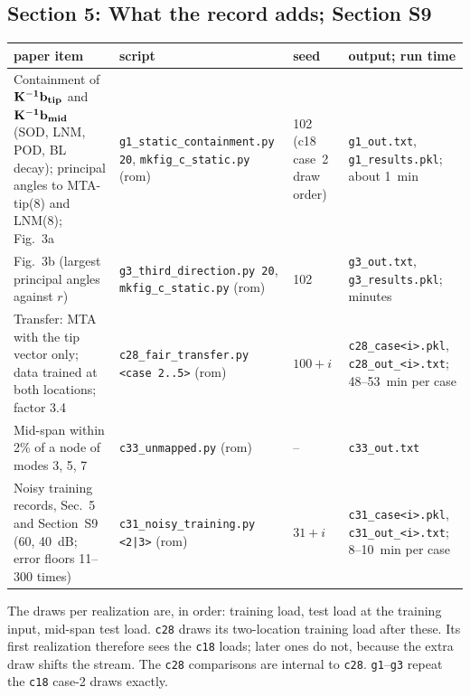 \documentclass[10pt]{article}
\newcommand{\f}[1]{\texttt{#1}}
\begin{document}
\subsection*{Section 5: What the record adds; Section S9}
\begin{longtable}{L{0.31\textwidth}L{0.25\textwidth}L{0.08\textwidth}L{0.25\textwidth}}
\toprule
paper item & script & seed & output; run time\\ \midrule
Containment of $\bf K^{-1}b_{tip}$ and $\bf K^{-1}b_{mid}$ (SOD, LNM, POD, BL decay); principal angles to MTA-tip(8) and LNM(8); Fig.~3a & \f{g1\_\allowbreak{}static\_\allowbreak{}containment.py 20}, \f{mkfig\_\allowbreak{}c\_\allowbreak{}static.py} (rom) & 102 (c18 case~2 draw order) & \f{g1\_\allowbreak{}out.txt}, \f{g1\_\allowbreak{}results.pkl}; about 1~min\\
Fig.~3b (largest principal angles against $r$) & \f{g3\_\allowbreak{}third\_\allowbreak{}direction.py 20}, \f{mkfig\_\allowbreak{}c\_\allowbreak{}static.py} (rom) & 102 & \f{g3\_\allowbreak{}out.txt}, \f{g3\_\allowbreak{}results.pkl}; minutes\\
Transfer: MTA with the tip vector only; data trained at both locations; factor 3.4 & \f{c28\_\allowbreak{}fair\_\allowbreak{}transfer.py <case 2..5>} (rom) & $100+i$ & \f{c28\_\allowbreak{}case<i>.pkl}, \f{c28\_\allowbreak{}out\_\allowbreak{}<i>.txt}; 48--53~min per case\\
Mid-span within 2\% of a node of modes 3, 5, 7 & \f{c33\_\allowbreak{}unmapped.py} (rom) & -- & \f{c33\_\allowbreak{}out.txt}\\
Noisy training records, Sec.~5 and Section~S9 (60, 40~dB; error floors 11--300 times) & \f{c31\_\allowbreak{}noisy\_\allowbreak{}training.py <2|3>} (rom) & $31+i$ & \f{c31\_\allowbreak{}case<i>.pkl}, \f{c31\_\allowbreak{}out\_\allowbreak{}<i>.txt}; 8--10~min per case\\
\bottomrule
\end{longtable}
The draws per realization are, in order: training load, test load at the training input, mid-span test load. \f{c28} draws its two-location training load after these. Its first realization therefore sees the \f{c18} loads; later ones do not, because the extra draw shifts the stream. The \f{c28} comparisons are internal to \f{c28}. \f{g1}--\f{g3} repeat the \f{c18} case-2 draws exactly.
\end{document}
